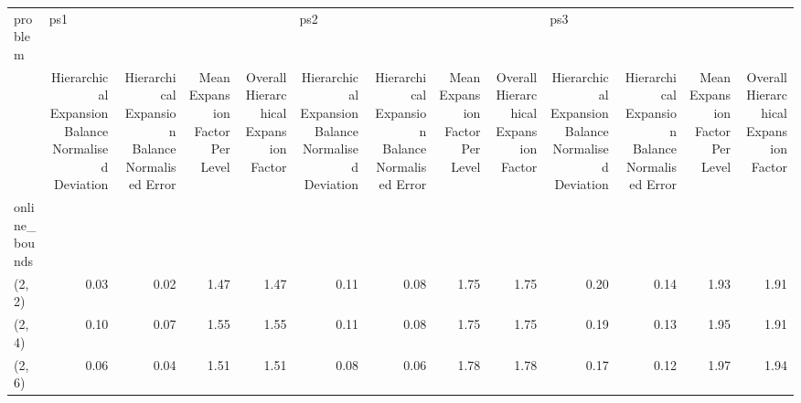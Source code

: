 \begin{tabular}{lrrrrrrrrrrrr}
\toprule
problem & \multicolumn{4}{l}{ps1} & \multicolumn{4}{l}{ps2} & \multicolumn{4}{l}{ps3} \\
{} & Hierarchical Expansion Balance Normalised Deviation & Hierarchical Expansion Balance Normalised Error & Mean Expansion Factor Per Level & Overall Hierarchical Expansion Factor & Hierarchical Expansion Balance Normalised Deviation & Hierarchical Expansion Balance Normalised Error & Mean Expansion Factor Per Level & Overall Hierarchical Expansion Factor & Hierarchical Expansion Balance Normalised Deviation & Hierarchical Expansion Balance Normalised Error & Mean Expansion Factor Per Level & Overall Hierarchical Expansion Factor \\
online\_bounds &                                                     &                                                 &                                 &                                       &                                                     &                                                 &                                 &                                       &                                                     &                                                 &                                 &                                       \\
\midrule
(2, 2)        &                                               0.03 &                                            0.02 &                            1.47 &                                  1.47 &                                               0.11 &                                            0.08 &                            1.75 &                                  1.75 &                                               0.20 &                                            0.14 &                            1.93 &                                  1.91 \\
(2, 4)        &                                               0.10 &                                            0.07 &                            1.55 &                                  1.55 &                                               0.11 &                                            0.08 &                            1.75 &                                  1.75 &                                               0.19 &                                            0.13 &                            1.95 &                                  1.91 \\
(2, 6)        &                                               0.06 &                                            0.04 &                            1.51 &                                  1.51 &                                               0.08 &                                            0.06 &                            1.78 &                                  1.78 &                                               0.17 &                                            0.12 &                            1.97 &                                  1.94 \\

\end{tabular}
